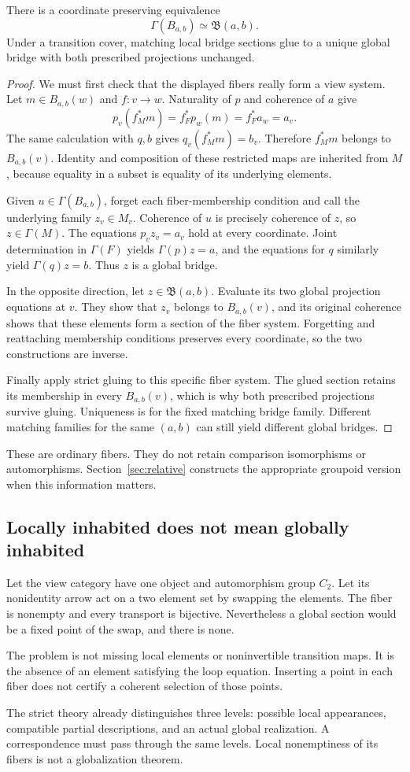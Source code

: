 \begin{theorem}\label{KS06}
There is a coordinate preserving equivalence
\[
 \Gamma(B_{a,b})\simeq\mathfrak B(a,b).
\]
Under a transition cover, matching local bridge sections glue to a unique global bridge with both prescribed projections unchanged.
\end{theorem}
\begin{proof}
We must first check that the displayed fibers really form a view system. Let $m\in B_{a,b}(w)$ and $f:v\to w$. Naturality of $p$ and coherence of $a$ give
\[
 p_v(f_M^*m)=f_F^*p_w(m)=f_F^*a_w=a_v.
\]
The same calculation with $q,b$ gives $q_v(f_M^*m)=b_v$. Therefore $f_M^*m$ belongs to $B_{a,b}(v)$. Identity and composition of these restricted maps are inherited from $M$, because equality in a subset is equality of its underlying elements.

Given $u\in\Gamma(B_{a,b})$, forget each fiber-membership condition and call the underlying family $z_v\in M_v$. Coherence of $u$ is precisely coherence of $z$, so $z\in\Gamma(M)$. The equations $p_vz_v=a_v$ hold at every coordinate. Joint determination in $\Gamma(F)$ yields $\Gamma(p)z=a$, and the equations for $q$ similarly yield $\Gamma(q)z=b$. Thus $z$ is a global bridge.

In the opposite direction, let $z\in\mathfrak B(a,b)$. Evaluate its two global projection equations at $v$. They show that $z_v$ belongs to $B_{a,b}(v)$, and its original coherence shows that these elements form a section of the fiber system. Forgetting and reattaching membership conditions preserves every coordinate, so the two constructions are inverse.

Finally apply strict gluing to this specific fiber system. The glued section retains its membership in every $B_{a,b}(v)$, which is why both prescribed projections survive gluing. Uniqueness is for the fixed matching bridge family. Different matching families for the same $(a,b)$ can still yield different global bridges.
\end{proof}
These are ordinary fibers. They do not retain comparison isomorphisms or automorphisms. Section~\ref{sec:relative} constructs the appropriate groupoid version when this information matters.

\subsection{Locally inhabited does not mean globally inhabited}
\begin{example}\label{KS07}
Let the view category have one object and automorphism group \(C_2\). Let its nonidentity arrow act on a two element set by swapping the elements. The fiber is nonempty and every transport is bijective. Nevertheless a global section would be a fixed point of the swap, and there is none.
\end{example}
The problem is not missing local elements or noninvertible transition maps. It is the absence of an element satisfying the loop equation. Inserting a point in each fiber does not certify a coherent selection of those points.

\begin{insight}
The strict theory already distinguishes three levels: possible local appearances, compatible partial descriptions, and an actual global realization. A correspondence must pass through the same levels. Local nonemptiness of its fibers is not a globalization theorem.
\end{insight}
